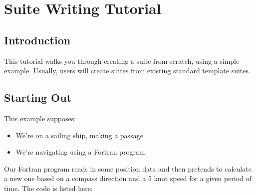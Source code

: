 
\section{Suite Writing Tutorial}

\subsection{Introduction}

This tutorial walks you through creating a suite from scratch, using a simple example. Usually, users will create suites from existing standard template suites.

\subsection{Starting Out}

This example supposes:
\begin{itemize}
    \item We're on a sailing ship, making a passage
    \item We're navigating using a Fortran program
\end{itemize}

Our Fortran program reads in some position data and then pretends to calculate a new one based on a compass direction and a 5 knot speed for a given period of time. The code is listed here:

